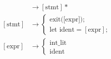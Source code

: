 \documentclass[11pt]{article}
\begin{document}
\begin{align}
  [\text{prog}] &\to [\text{stmt}]* \\
  [\text{stmt}] &\to
  \begin{cases}
    \text{exit([expr])}; \\
    \text{let ident} = [\text{expr}];
  \end{cases} \\
  [\text{expr}] &\to
  \begin{cases}
    \text{int\_lit} \\
    \text{ident}
  \end{cases}
\end{align}
\end{document}
